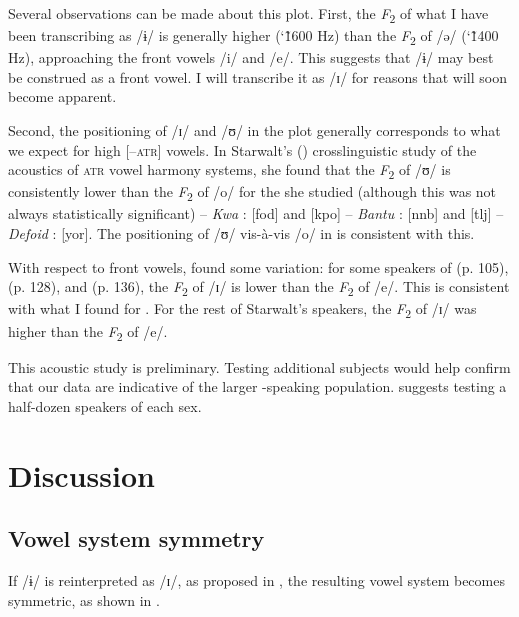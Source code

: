 \documentclass[output=paper,colorlinks,citecolor=brown]{langscibook}
\begin{document}
Several observations can be made about this plot. First, the \textit{F}\textsubscript{2} of what I have been transcribing as /ɨ/ is generally higher (\char`\~1600 Hz) than the \textit{F}\textsubscript{2} of /ə/ (\char`\~1400 Hz), approaching the front vowels /i/ and /e/. This suggests that /ɨ/ may best be construed as a front vowel. I will transcribe it as /ɪ/ for reasons that will soon become apparent.

Second, the positioning of /ɪ/ and /ʊ/ in the plot generally corresponds to what we expect for high [–\textsc{atr}] vowels. In Starwalt's (\citeyear{Starwalt2008}) crosslinguistic study of the acoustics of \textsc{atr} vowel harmony  systems, she found that the \textit{F}\textsubscript{2} of /ʊ/ is consistently lower than the \textit{F}\textsubscript{2} of /o/ for the  she studied (although this was not always statistically significant) -- \textit{Kwa} :  [fod] and  [kpo] -- \textit{Bantu} :  [nnb] and  [tlj] -- \textit{Defoid} :  [yor]. The positioning of /ʊ/ vis-à-vis /o/ in  is consistent with this.

With respect to front vowels, \citeauthor{Starwalt2008} found some variation: for some speakers of  (p. 105),  (p. 128), and  (p. 136), the \textit{F}\textsubscript{2} of /ɪ/ is lower than the \textit{F}\textsubscript{2} of /e/. This is consistent with what I found for . For the rest of Starwalt’s speakers, the \textit{F}\textsubscript{2} of /ɪ/ was higher than the \textit{F}\textsubscript{2} of /e/.

This acoustic study  is preliminary. Testing additional subjects would help confirm that our data are indicative of the larger -speaking population. \citet{Ladefoged2003} suggests testing a half-dozen speakers of each sex.

\section{Discussion}\label{sec:olson:4}

\subsection{Vowel system symmetry}

If /ɨ/ is reinterpreted as /ɪ/, as proposed in , the resulting  vowel system  becomes  symmetric, as shown in .
\end{document}
